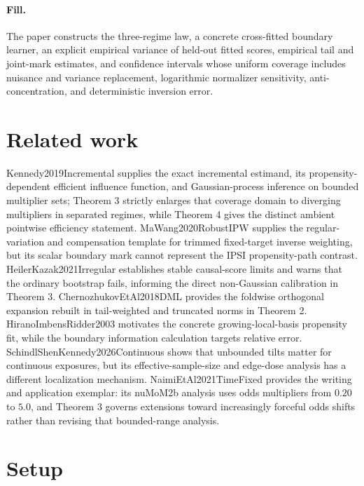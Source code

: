 \documentclass{article}
\begin{document}
\paragraph{Fill.} The paper constructs the three-regime law, a concrete cross-fitted boundary learner, an explicit empirical variance of held-out fitted scores, empirical tail and joint-mark estimates, and confidence intervals whose uniform coverage includes nuisance and variance replacement, logarithmic normalizer sensitivity, anti-concentration, and deterministic inversion error.

\section{Related work}

Kennedy2019Incremental supplies the exact incremental estimand, its propensity-dependent efficient influence function, and Gaussian-process inference on bounded multiplier sets; Theorem 3 strictly enlarges that coverage domain to diverging multipliers in separated regimes, while Theorem 4 gives the distinct ambient pointwise efficiency statement. MaWang2020RobustIPW supplies the regular-variation and compensation template for trimmed fixed-target inverse weighting, but its scalar boundary mark cannot represent the IPSI propensity-path contrast. HeilerKazak2021Irregular establishes stable causal-score limits and warns that the ordinary bootstrap fails, informing the direct non-Gaussian calibration in Theorem 3. ChernozhukovEtAl2018DML provides the foldwise orthogonal expansion rebuilt in tail-weighted and truncated norms in Theorem 2. HiranoImbensRidder2003 motivates the concrete growing-local-basis propensity fit, while the boundary information calculation targets relative error. SchindlShenKennedy2026Continuous shows that unbounded tilts matter for continuous exposures, but its effective-sample-size and edge-dose analysis has a different localization mechanism. NaimiEtAl2021TimeFixed provides the writing and application exemplar: its nuMoM2b analysis uses odds multipliers from \(0.20\) to \(5.0\), and Theorem 3 governs extensions toward increasingly forceful odds shifts rather than revising that bounded-range analysis.

\section{Setup}
\end{document}
